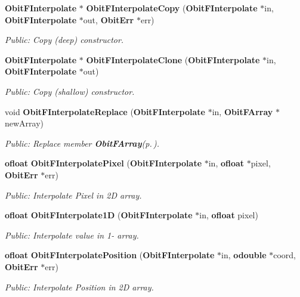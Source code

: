 \begin{CompactItemize}
{\bf Obit\-FInterpolate} $\ast$ {\bf Obit\-FInterpolate\-Copy} ({\bf Obit\-FInterpolate} $\ast$in, {\bf Obit\-FInterpolate} $\ast$out, {\bf Obit\-Err} $\ast$err)
\begin{CompactList}\small\item\em Public: Copy (deep) constructor. \item\end{CompactList}\item 
{\bf Obit\-FInterpolate} $\ast$ {\bf Obit\-FInterpolate\-Clone} ({\bf Obit\-FInterpolate} $\ast$in, {\bf Obit\-FInterpolate} $\ast$out)
\begin{CompactList}\small\item\em Public: Copy (shallow) constructor. \item\end{CompactList}\item 
void {\bf Obit\-FInterpolate\-Replace} ({\bf Obit\-FInterpolate} $\ast$in, {\bf Obit\-FArray} $\ast$new\-Array)
\begin{CompactList}\small\item\em Public: Replace member {\bf Obit\-FArray}{\rm (p.\,\pageref{structObitFArray})}. \item\end{CompactList}\item 
{\bf ofloat} {\bf Obit\-FInterpolate\-Pixel} ({\bf Obit\-FInterpolate} $\ast$in, {\bf ofloat} $\ast$pixel, {\bf Obit\-Err} $\ast$err)
\begin{CompactList}\small\item\em Public: Interpolate Pixel in 2D array. \item\end{CompactList}\item 
{\bf ofloat} {\bf Obit\-FInterpolate1D} ({\bf Obit\-FInterpolate} $\ast$in, {\bf ofloat} pixel)
\begin{CompactList}\small\item\em Public: Interpolate value in 1- array. \item\end{CompactList}\item 
{\bf ofloat} {\bf Obit\-FInterpolate\-Position} ({\bf Obit\-FInterpolate} $\ast$in, {\bf odouble} $\ast$coord, {\bf Obit\-Err} $\ast$err)
\begin{CompactList}\small\item\em Public: Interpolate Position in 2D array. \item\end{CompactList}\item 

\end{CompactItemize}
